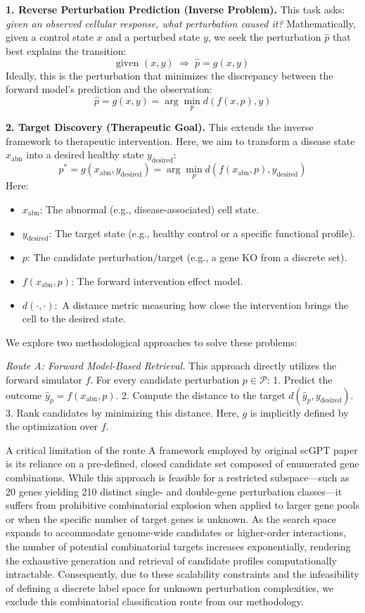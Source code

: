 \documentclass{article}
\begin{document}
\textbf{1. Reverse Perturbation Prediction (Inverse Problem).}
This task asks: \textit{given an observed cellular response, what perturbation caused it?}
Mathematically, given a control state $x$ and a perturbed state $y$, we seek the perturbation $\hat{p}$ that best explains the transition:
\[
\text{given } (x, y) \;\Rightarrow\; \hat p = g(x, y)
\]
Ideally, this is the perturbation that minimizes the discrepancy between the forward model's prediction and the observation:
\[
\hat p = g(x, y) = \arg\min_{p} d\!\left(f(x, p), y\right)
\]

\textbf{2. Target Discovery (Therapeutic Goal).}
This extends the inverse framework to therapeutic intervention. Here, we aim to transform a disease state $x_{\text{abn}}$ into a desired healthy state $y_{\text{desired}}$:
\[
p^{*} = g(x_{\text{abn}}, y_{\text{desired}}) = \arg\min_{p} d\!\left(f(x_{\text{abn}}, p), y_{\text{desired}}\right)
\]
Here:
\begin{itemize}
    \item $x_{\text{abn}}$: The abnormal (e.g., disease-associated) cell state.
    \item $y_{\text{desired}}$: The target state (e.g., healthy control or a specific functional profile).
    \item $p$: The candidate perturbation/target (e.g., a gene KO from a discrete set).
    \item $f(x_{\text{abn}}, p)$: The forward intervention effect model.
    \item $d(\cdot,\cdot)$:\ A distance metric measuring how close the intervention brings the cell to the desired state.
\end{itemize}

We explore two methodological approaches to solve these problems:

\textit{Route A: Forward Model-Based Retrieval.}
This approach directly utilizes the forward simulator $f$. For every candidate perturbation $p \in \mathcal{P}$:
1. Predict the outcome $\hat{y}_p = f(x_{\text{abn}}, p)$.
2. Compute the distance to the target $d(\hat{y}_p, y_{\text{desired}})$.
3. Rank candidates by minimizing this distance. Here, $g$ is implicitly defined by the optimization over $f$.

A critical limitation of the route A framework employed by original scGPT paper is its reliance on a pre-defined, closed candidate set composed of enumerated gene combinations. While this approach is feasible for a restricted subspace---such as 20 genes yielding 210 distinct single- and double-gene perturbation classes---it suffers from prohibitive combinatorial explosion when applied to larger gene pools or when the specific number of target genes is unknown. As the search space expands to accommodate genome-wide candidates or higher-order interactions, the number of potential combinatorial targets increases exponentially, rendering the exhaustive generation and retrieval of candidate profiles computationally intractable. Consequently, due to these scalability constraints and the infeasibility of defining a discrete label space for unknown perturbation complexities, we exclude this combinatorial classification route from our methodology.
\end{document}
